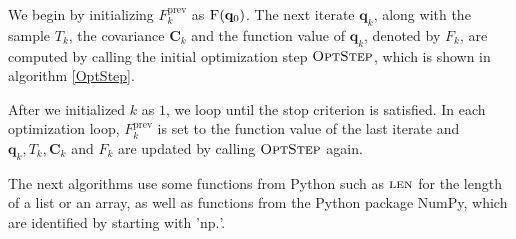 We begin by initializing $F^\mathrm{prev}_{k}$ as $\Call{F}{\mathbf{q}_0}$. The next iterate $\mathbf{q}_k$, along with the sample $T_k$, the covariance $\mathbf{C}_k$ and the function value of $\mathbf{q}_k$, denoted by $F_k$, are computed by calling the initial optimization step $\textproc{OptStep}$, which is shown in algorithm \ref{OptStep}.

After we initialized $k$ as $1$, we loop until the stop criterion is satisfied. In each optimization loop, $F^\mathrm{prev}_{k}$ is set to the function value of the last iterate and $\mathbf{q}_k,T_k,\mathbf{C}_k$ and $F_k$ are updated by calling $\textproc{OptStep}$ again.

The next algorithms use some functions from Python such as $\textproc{len}$ for the length of a list or an array, as well as functions from the Python package NumPy, which are identified by starting with '$\mathrm{np.}$'.

